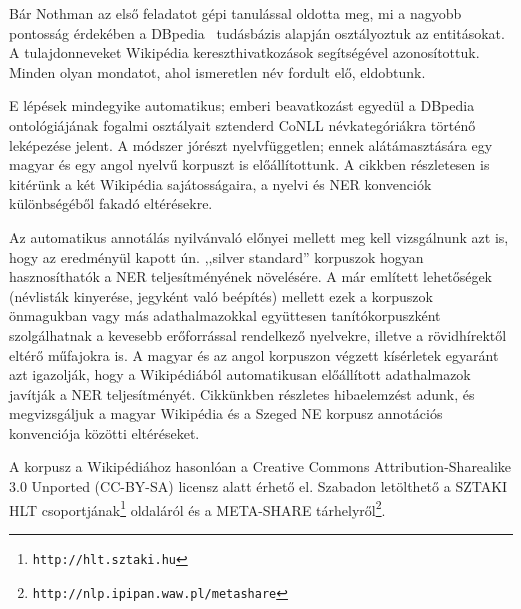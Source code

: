 \documentclass{llncs}
\begin{document}
Bár Nothman az első feladatot gépi tanulással oldotta meg, mi a nagyobb
pontosság érdekében a DBpedia~\cite{Bizer:09} tudásbázis alapján osztályoztuk az
entitásokat. A tulajdonneveket Wikipédia kereszthivatkozások segítségével azonosítottuk.
Minden olyan mondatot, ahol ismeretlen név fordult elő, eldobtunk.

E lépések mindegyike automatikus; emberi beavatkozást egyedül a DBpedia ontológiájának
fogalmi osztályait
sztenderd CoNLL névkategóriákra történő leképezése jelent. A módszer jórészt
nyelvfüggetlen; ennek alátámasztására egy magyar és egy angol nyelvű korpuszt is
előállítottunk. A cikkben részletesen is kitérünk a két Wikipédia sajátosságaira, a
nyelvi és NER konvenciók különbségéből fakadó eltérésekre.


Az automatikus annotálás nyilvánvaló előnyei mellett meg kell vizsgálnunk azt is, hogy az
eredményül kapott  ún. ,,silver standard'' korpuszok hogyan hasznosíthatók a NER
teljesítményének növelésére. A már említett lehetőségek (névlisták kinyerése, jegyként
való beépítés) mellett ezek a korpuszok önmagukban vagy más adathalmazokkal együttesen
tanítókorpuszként szolgálhatnak a kevesebb erőforrással rendelkező nyelvekre, illetve a
rövidhírektől eltérő műfajokra is. A magyar és az angol korpuszon végzett kísérletek
egyaránt azt igazolják, hogy a Wikipédiából automatikusan előállított adathalmazok
javítják a NER teljesítményét. Cikkünkben részletes hibaelemzést adunk, és megvizsgáljuk
a magyar Wikipédia és a Szeged NE korpusz\cite{Szarvas:06} annotációs konvenciója közötti
eltéréseket.


A korpusz a Wikipédiához hasonlóan a Creative Commons Attribution-Sharealike
3.0 Unported (CC-BY-SA) licensz alatt érhető el. Szabadon letölthető a SZTAKI HLT
csoportjának\footnote{\texttt{http://hlt.sztaki.hu}} oldaláról és a META-SHARE
tárhelyről\footnote{\texttt{http://nlp.ipipan.waw.pl/metashare}}.


%
%


\end{document}
